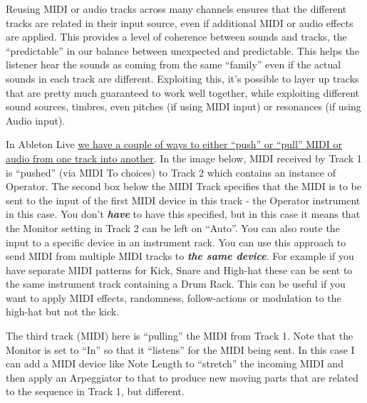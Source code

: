 \documentclass[
  12pt,
  letterpaper,
  oneside,
  open=any]{scrbook}
\begin{document}
\begin{tcolorbox}[enhanced jigsaw, opacitybacktitle=0.6, rightrule=.15mm, leftrule=.75mm, opacityback=0, toptitle=1mm, toprule=.15mm, breakable, titlerule=0mm, colback=white, bottomtitle=1mm, title=\textcolor{quarto-callout-tip-color}{\faLightbulb}\hspace{0.5em}{Key idea}, coltitle=black, left=2mm, colframe=quarto-callout-tip-color-frame, bottomrule=.15mm, colbacktitle=quarto-callout-tip-color!10!white, arc=.35mm]

Reusing MIDI or audio tracks across many channels ensures that the
different tracks are related in their input source, even if additional
MIDI or audio effects are applied. This provides a level of coherence
between sounds and tracks, the ``predictable'' in our balance between
unexpected and predictable. This helps the listener hear the sounds as
coming from the same ``family'' even if the actual sounds in each track
are different. Exploiting this, it's possible to layer up tracks that
are pretty much guaranteed to work well together, while exploiting
different sound sources, timbres, even pitches (if using MIDI input) or
resonances (if using Audio input).

\end{tcolorbox}

In Ableton Live
\href{https://www.ableton.com/en/live-manual/11/routing-and-i-o/\#routing-and-io}{we
have a couple of ways to either ``push'' or ``pull'' MIDI or audio from
one track into another}. In the image below, MIDI received by Track 1 is
``pushed'' (via MIDI To choices) to Track 2 which contains an instance
of Operator. The second box below the MIDI Track specifies that the MIDI
is to be sent to the input of the first MIDI device in this track - the
Operator instrument in this case. You don't \textbf{\emph{have}} to have
this specified, but in this case it means that the Monitor setting in
Track 2 can be left on ``Auto''. You can also route the input to a
specific device in an instrument rack. You can use this approach to send
MIDI from multiple MIDI tracks to \textbf{\emph{the same device}}. For
example if you have separate MIDI patterns for Kick, Snare and High-hat
these can be sent to the same instrument track containing a Drum Rack.
This can be useful if you want to apply MIDI effects, randomness,
follow-actions or modulation to the high-hat but not the kick.

The third track (MIDI) here is ``pulling'' the MIDI from Track 1. Note
that the Monitor is set to ``In'' so that it ``listens'' for the MIDI
being sent. In this case I can add a MIDI device like Note Length to
``stretch'' the incoming MIDI and then apply an Arpeggiator to that to
produce new moving parts that are related to the sequence in Track 1,
but different.
\end{document}
